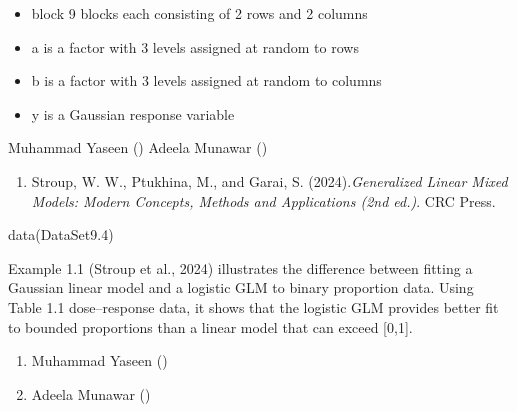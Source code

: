 \documentclass[a4paper]{book}
\begin{document}
%
\begin{Details}
\begin{itemize}

\item{} block  9 blocks each consisting of 2 rows and 2 columns
\item{} a      is a factor with 3 levels assigned at random to rows
\item{} b      is a factor with 3 levels assigned at random to columns
\item{} y      is a Gaussian response variable

\end{itemize}

\end{Details}
%
\begin{Author}
Muhammad Yaseen ()
Adeela Munawar ()
\end{Author}
%
\begin{References}
\begin{enumerate}

\item{} Stroup, W. W., Ptukhina, M., and Garai, S. (2024).\emph{Generalized Linear Mixed Models: Modern Concepts, Methods and Applications (2nd ed.)}.
CRC Press.

\end{enumerate}

\end{References}
%
\begin{SeeAlso}
\end{SeeAlso}
%
\begin{Examples}
\begin{ExampleCode}
data(DataSet9.4)
\end{ExampleCode}
\end{Examples}
%
\begin{Description}
Example 1.1 (Stroup et al., 2024) illustrates the difference between fitting
a Gaussian linear model and a logistic GLM to binary proportion data.
Using Table 1.1 dose–response data, it shows that the logistic GLM provides
better fit to bounded proportions than a linear model that can exceed [0,1].
\end{Description}
%
\begin{Author}
\begin{enumerate}

\item{} Muhammad Yaseen ()
\item{} Adeela Munawar ()

\end{enumerate}

\end{Author}
\end{document}

